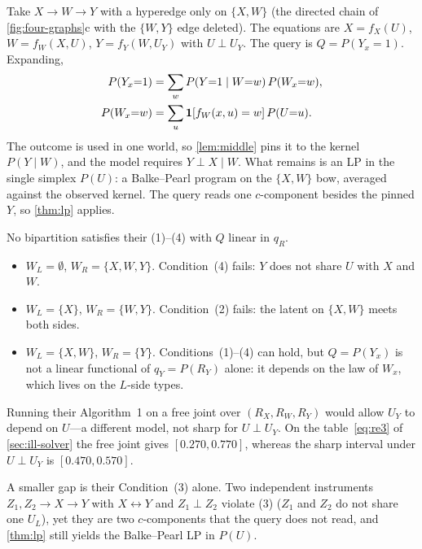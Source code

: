 \begin{example}
\label{ex:mediated}
Take $X\to W\to Y$ with a hyperedge only on $\{X,W\}$ (the directed chain of
\cref{fig:four-graphs}c with the $\{W,Y\}$ edge deleted). The equations are
$X=f_X(U)$, $W=f_W(X,U)$, $Y=f_Y(W,U_Y)$ with $U\perp U_Y$. The query is
$Q=P(Y_x{=}1)$. Expanding,
\begin{align}
\label{eq:mediated}
P(Y_x{=}1)
&=
\sum_w P(Y{=}1\mid W{=}w)\,P(W_x{=}w),
\\
P(W_x{=}w)
&=
\sum_u
\mathbf{1}[f_W(x,u)=w]\,P(U{=}u).
\nonumber
\end{align}
The outcome is used in one world, so \cref{lem:middle} pins it to the
kernel $P(Y\mid W)$, and the model requires $Y\perp X\mid W$. What remains
is an LP in the single simplex $P(U)$: a Balke--Pearl program on the
$\{X,W\}$ bow, averaged against the observed kernel. The query reads one
$c$-component besides the pinned $Y$, so \cref{thm:lp} applies.

No bipartition satisfies their (1)--(4) with $Q$ linear in $q_R$.
\begin{itemize}[leftmargin=1.4em,itemsep=0.15em]
\item $W_L=\emptyset$, $W_R=\{X,W,Y\}$. Condition~(4) fails: $Y$ does not
share $U$ with $X$ and $W$.
\item $W_L=\{X\}$, $W_R=\{W,Y\}$. Condition~(2) fails: the latent on
$\{X,W\}$ meets both sides.
\item $W_L=\{X,W\}$, $W_R=\{Y\}$. Conditions~(1)--(4) can hold, but
$Q=P(Y_x)$ is not a linear functional of $q_Y=P(R_Y)$ alone: it depends on
the law of $W_x$, which lives on the $L$-side types.
\end{itemize}
Running their Algorithm~1 on a free joint over $(R_X,R_W,R_Y)$ would allow
$U_Y$ to depend on $U$---a different model, not sharp for $U\perp U_Y$. On
the table~\eqref{eq:re3} of \cref{sec:ill-solver} the free joint gives
$[0.270,0.770]$, whereas the sharp interval under $U\perp U_Y$ is
$[0.470,0.570]$.
\end{example}

A smaller gap is their Condition~(3) alone. Two independent instruments
$Z_1,Z_2\to X\to Y$ with $X\leftrightarrow Y$ and $Z_1\perp Z_2$ violate
(3) ($Z_1$ and $Z_2$ do not share one $U_L$), yet they are two
$c$-components that the query does not read, and \cref{thm:lp} still yields
the Balke--Pearl LP in $P(U)$.

\clearpage

